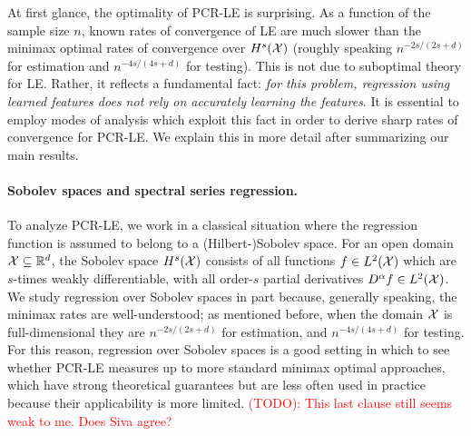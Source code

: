 At first glance, the optimality of PCR-LE is surprising. As a function of the sample size $n$, known rates of convergence of LE are much slower than the minimax optimal rates of convergence over $H^s(\mathcal{X})$ (roughly speaking $n^{-2s/(2s + d)}$ for estimation and $n^{-4s/(4s + d)}$ for testing). This is not due to suboptimal theory for LE. Rather, it reflects a fundamental fact: \emph{for this problem, regression using learned features does not rely on accurately learning the features}. It is essential to employ modes of analysis which exploit this fact in order to derive sharp rates of convergence for PCR-LE. We explain this in more detail after summarizing our main results.

\paragraph{Sobolev spaces and spectral series regression.}
To analyze PCR-LE, we work in a classical situation where the regression function is assumed to belong to a (Hilbert-)Sobolev space. For an open domain $\mathcal{X} \subseteq \mathbb{R}^d$, the Sobolev space $H^s(\mathcal{X})$ consists of all functions $f \in L^2(\mathcal{X})$ which are $s$-times weakly differentiable, with all order-$s$ partial derivatives $D^{\alpha}f \in L^2(\mathcal{X})$. We study regression over Sobolev spaces in part because, generally speaking, the minimax rates are well-understood; as mentioned before, when the domain $\mathcal{X}$ is full-dimensional they are $n^{-2s/(2s + d)}$ for estimation, and $n^{-4s/(4s + d)}$ for testing. For this reason, regression over Sobolev spaces is a good setting in which to see whether PCR-LE measures up to more standard minimax optimal approaches, which have strong theoretical guarantees but are less often used in practice because their applicability is more limited. \textcolor{red}{(TODO): This last clause still seems weak to me. Does Siva agree?}

